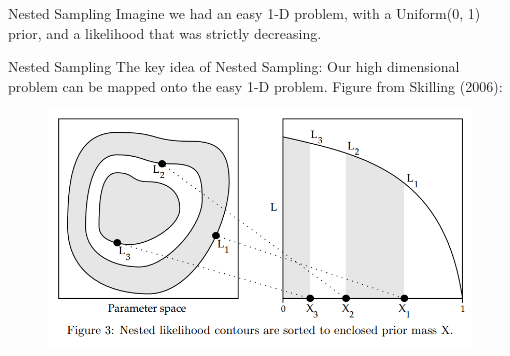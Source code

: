 \documentclass{beamer}
\begin{document}
\begin{frame}[t]{Nested Sampling}
Imagine we had an easy 1-D problem, with a Uniform(0, 1) prior, and a likelihood
that was strictly decreasing.


\end{frame}


\begin{frame}[t]{Nested Sampling}
The key idea of Nested Sampling: Our high dimensional problem can be mapped
onto the easy 1-D problem. Figure from Skilling (2006):

\begin{figure}
\begin{center}
\includegraphics[scale=0.3]{ns.png}
\end{center}
\end{figure}

\end{frame}
\end{document}
